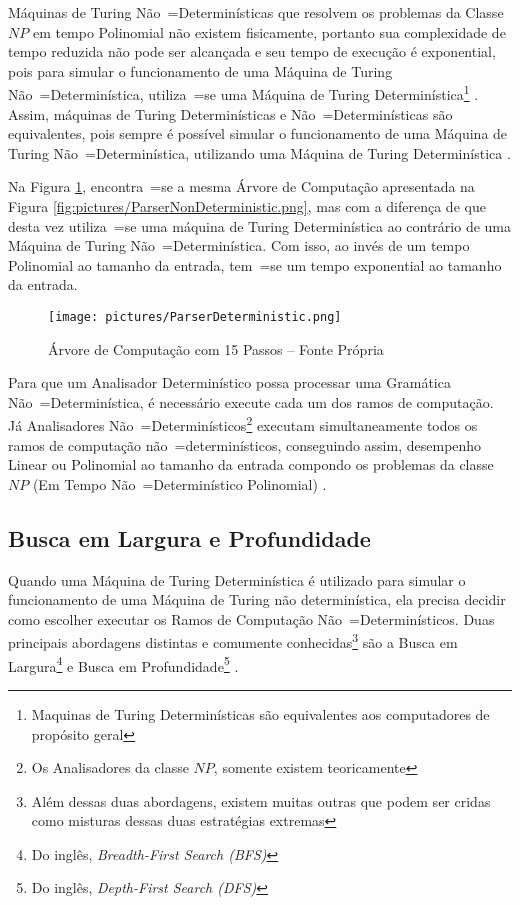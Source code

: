 {    Máquinas de Turing Não~=Determinísticas que resolvem os problemas da Classe $NP$ em tempo Polinomial não existem fisicamente,
    portanto sua complexidade de tempo reduzida não pode ser alcançada e
    seu tempo de execução é exponential,
    pois para simular o funcionamento de uma Máquina de Turing Não~=Determinística,
    utiliza~=se uma Máquina de Turing Determinística\footnote{
    Maquinas de Turing Determinísticas são equivalentes aos computadores de propósito geral
    } \cite{sipserBook,turingMachinesRoyer}.
    Assim,
    máquinas de Turing Determinísticas e
    Não~=Determinísticas são equivalentes,
    pois sempre é possível simular o funcionamento de uma Máquina de Turing Não~=Determinística,
    utilizando uma Máquina de Turing Determinística \cite{hopcroftBook}.

    Na Figura \ref{fig:pictures/ParserDeterministic.png},
    encontra~=se a mesma Árvore de Computação apresentada na Figura \ref{fig:pictures/ParserNonDeterministic.png},
    mas com a diferença de que desta vez utiliza~=se uma máquina de Turing Determinística ao contrário de uma Máquina de Turing Não~=Determinística.
    Com isso,
    ao invés de um tempo Polinomial ao tamanho da entrada,
    tem~=se um tempo exponential ao tamanho da entrada.
    \begin{figure}[h]
    \centering
    \texttt{[image: pictures/ParserDeterministic.png]}
    \caption{Árvore de Computação com 15 Passos -- Fonte Própria}
    \label{fig:pictures/ParserDeterministic.png}
    \end{figure}

    Para que um Analisador Determinístico possa processar uma Gramática Não~=Determinística,
    é necessário execute cada um dos ramos de computação.
    Já Analisadores Não~=Determinísticos\footnote{
    Os Analisadores da classe $NP$,
    somente existem teoricamente
    } executam simultaneamente todos os ramos de computação não~=determinísticos,
    conseguindo assim, desempenho Linear ou
    Polinomial ao tamanho da entrada compondo os problemas da classe $NP$ (Em Tempo Não~=Determinístico Polinomial) \cite{hopcroftBook}.


\subsection{Busca em Largura e Profundidade}

    Quando uma Máquina de Turing Determinística é utilizado para simular o funcionamento de uma Máquina de Turing não determinística,
    ela precisa decidir como escolher executar os Ramos de Computação Não~=Determinísticos.
    Duas principais abordagens distintas e
    comumente conhecidas\footnote{
    Além dessas duas abordagens,
    existem muitas outras que podem ser cridas como misturas dessas duas estratégias extremas
    } são a Busca em Largura\footnote{
    Do inglês, \textit{Breadth-First Search (BFS)}
    } e
    Busca em Profundidade\footnote{ Do inglês,
    \textit{Depth-First Search (DFS)} } \cite{cormenIntroductionToAlgorithms}.

}
